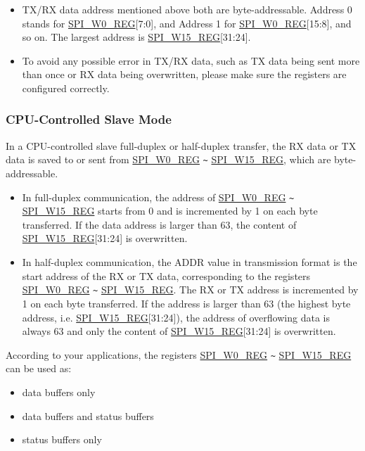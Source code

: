 \documentclass[main\_\_EN.tex]{subfiles}
\begin{document}
\begin{tiplisting}
\vspace{-2em}
\begin{itemize}
    \item TX/RX data address mentioned above both are byte-addressable. Address 0 stands for \hyperref[regdesc:SPIW0REG]{SPI\_W0\_REG}[7:0], and Address 1 for \hyperref[regdesc:SPIW0REG]{SPI\_W0\_REG}[15:8], and so on. The largest address is \hyperref[regdesc:SPIW15REG]{SPI\_W15\_REG}[31:24].
    \item To avoid any possible error in TX/RX data, such as TX data being sent more than once or RX data being overwritten, please make sure the registers are configured correctly.
\end{itemize}
\end{tiplisting}

\subsubsection{CPU-Controlled Slave Mode} \label{sec:spi-cpu-ctrl-slave}

In a CPU-controlled slave full-duplex or half-duplex transfer, the RX data or TX data is saved to or sent from \hyperref[regdesc:SPIW0REG]{SPI\_W0\_REG} \verb+~+ \hyperref[regdesc:SPIW15REG]{SPI\_W15\_REG}, which are byte-addressable.

\begin{itemize}
    \item In full-duplex communication, the address of \hyperref[regdesc:SPIW0REG]{SPI\_W0\_REG} \verb+~+ \hyperref[regdesc:SPIW15REG]{SPI\_W15\_REG} starts from 0 and is incremented by 1 on each byte transferred. If the data address is larger than 63, the content of \hyperref[regdesc:SPIW15REG]{SPI\_W15\_REG}[31:24] is overwritten.
    \item In half-duplex communication, the ADDR value in transmission format is the start address of the RX or TX data, corresponding to the registers \hyperref[regdesc:SPIW0REG]{SPI\_W0\_REG} \verb+~+ \hyperref[regdesc:SPIW15REG]{SPI\_W15\_REG}. The RX or TX address is incremented by 1 on each byte transferred. If the address is larger than 63 (the highest byte address, i.e. \hyperref[regdesc:SPIW15REG]{SPI\_W15\_REG}[31:24]), the address of overflowing data is always 63 and only the content of \hyperref[regdesc:SPIW15REG]{SPI\_W15\_REG}[31:24] is overwritten.
\end{itemize}

According to your applications, the registers \hyperref[regdesc:SPIW0REG]{SPI\_W0\_REG} \verb+~+ \hyperref[regdesc:SPIW15REG]{SPI\_W15\_REG} can be used as:
\begin{itemize}
    \item data buffers only
    \item data buffers and status buffers
    \item status buffers only
\end{itemize}
\end{document}
